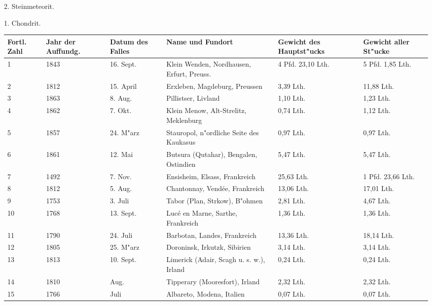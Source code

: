 \documentclass[a4paper, 11pt, oneside]{article}
\begin{document}
\clearpage
\begin{center}
2. Steinmeteorit.
\end{center}
\begin{center}
1. Chondrit.
\end{center}
\begin{center}
\begin{footnotesize}
\begin{tabular}{ |p{7mm}|p{7mm}|p{13mm}|p{48mm}|p{22mm}|p{22mm}| }
    \hline
    Fortl. Zahl & Jahr der Auffundg. & Datum des Falles & Name und Fundort & Gewicht des Hauptst"ucks & Gewicht aller St"ucke\\
    \hline\hline
    1 & 1843 & 16. Sept. & Klein Wenden, Nordhausen, Erfurt, Preuss. & 4 Pfd. 23,10 Lth. & 5 Pfd. 1,85 Lth.\\\hline
    2 & 1812 & 15. April & Erxleben, Magdeburg, Preussen & 3,39 Lth. & 11,88 Lth.\\\hline
    3 & 1863 & 8. Aug. & Pillistser, Livland & 1,10 Lth. & 1,23 Lth.\\\hline
    4 & 1862 & 7. Okt. & Klein Menow, Alt-Strelitz, Meklenburg & 0,74 Lth. & 1,12 Lth.\\\hline
    5 & 1857 & 24. M"arz & Stauropol, n"ordliche Seite des Kaukasus & 0,97 Lth. & 0,97 Lth.\\\hline
    6 & 1861 & 12. Mai & Butsura (Qutahar), Bengalen, Ostindien & 5,47 Lth. & 5,47 Lth.\\\hline
    7 & 1492 & 7. Nov. & Ensisheim, Elsass, Frankreich & 25,63 Lth. & 1 Pfd. 23,66 Lth.\\\hline
    8 & 1812 & 5. Aug. & Chantonnay, Vendée, Frankreich & 13,06 Lth. & 17,01 Lth.\\\hline
    9 & 1753 & 3. Juli & Tabor (Plan, Strkow), B"ohmen & 2,81 Lth. & 4,67 Lth.\\\hline
    10 & 1768 & 13. Sept. & Lucé en Marne, Sarthe, Frankreich & 1,36 Lth. & 1,36 Lth.\\\hline
    11 & 1790 & 24. Juli & Barbotan, Landes, Frankreich & 13,36 Lth. & 18,14 Lth.\\\hline
    12 & 1805 & 25. M"arz & Doroninsk, Irkutzk, Sibirien & 3,14 Lth. & 3,14 Lth.\\\hline
    13 & 1813 & 10. Sept. & Limerick (Adair, Scagh u. s. w.), Irland & 0,24 Lth. & 0,24 Lth.\\\hline
    14 & 1810 & Aug. & Tipperary (Mooresfort), Irland & 2,32 Lth. & 2,32 Lth.\\\hline
    15 & 1766 & Juli & Albareto, Modena, Italien & 0,07 Lth. & 0,07 Lth.\\\hline

\end{tabular}
\end{footnotesize}
\end{center}
\end{document}
